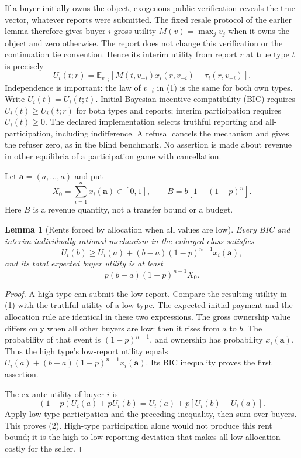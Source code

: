 \documentclass[11pt]{article}
\newtheorem{lemma}[theorem]{Lemma}
\theoremstyle{definition}
\theoremstyle{remark}
\begin{document}
If a buyer initially owns the object, exogenous public verification
reveals the true vector, whatever reports were submitted. The fixed
resale protocol of the earlier lemma therefore gives buyer $i$ gross
utility $M(v)=\max_j v_j$ when it owns the object and zero otherwise.
The report does not change this verification or the continuation tie
convention. Hence its interim utility from report $r$ at true type $t$
is precisely
\[
 U_i(t;r)=\mathbb E_{v_{-i}}[
 M(t,v_{-i})x_i(r,v_{-i})-\tau_i(r,v_{-i})].                 \tag{1}
\]
Independence is important: the law of $v_{-i}$ in (1) is the same for
both own types. Write $U_i(t)=U_i(t;t)$. Initial Bayesian incentive
compatibility (BIC) requires $U_i(t)\geq U_i(t;r)$ for both types and
reports; interim participation requires $U_i(t)\geq0$. The declared
implementation selects truthful reporting and all-participation,
including indifference. A refusal cancels the mechanism and gives the
refuser zero, as in the blind benchmark. No assertion is made about
revenue in other equilibria of a participation game with cancellation.

Let $\boldsymbol a=(a,\ldots,a)$ and put
\[
 X_0=\sum_{i=1}^n x_i(\boldsymbol a)\in[0,1],\qquad
 B=b[1-(1-p)^n].
\]
Here $B$ is a revenue quantity, not a transfer bound or a budget.

\begin{lemma}[Rents forced by allocation when all values are low]
Every BIC and interim individually rational mechanism in the enlarged
class satisfies
\[
 U_i(b)\geq U_i(a)+(b-a)(1-p)^{n-1}x_i(\boldsymbol a),
\]
and its total expected buyer utility is at least
\[
 p(b-a)(1-p)^{n-1}X_0.                                   \tag{2}
\]
\end{lemma}
\begin{proof}
A high type can submit the low report. Compare the resulting utility
in (1) with the truthful utility of a low type. The expected initial
payment and the allocation rule are identical in these two expressions.
The gross ownership value differs only when all other buyers are low:
then it rises from $a$ to $b$. The probability of that event is
$(1-p)^{n-1}$, and ownership has probability $x_i(\boldsymbol a)$.
Thus the high type's low-report utility equals
$U_i(a)+(b-a)(1-p)^{n-1}x_i(\boldsymbol a)$. Its BIC inequality proves
the first assertion.

The ex-ante utility of buyer $i$ is
\[
 (1-p)U_i(a)+pU_i(b)
 =U_i(a)+p[U_i(b)-U_i(a)].
\]
Apply low-type participation and the preceding inequality, then sum
over buyers. This proves (2). High-type participation alone would
not produce this rent bound; it is the high-to-low reporting deviation
that makes all-low allocation costly for the seller.
\end{proof}
\end{document}
